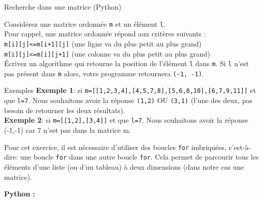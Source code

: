 \begin{Exercice}[20 minutes] Recherche dans une matrice (Python) %
    

    Considérez une matrice ordonnée \lstinline{m} et un élément \lstinline{l}.\\
    
    Pour rappel, une matrice ordonnée répond aux critères suivants :\\
     \lstinline{m[i][j]<=m[i+1][j]} (une ligne va du plus petit au plus grand)\\
     \lstinline{m[i][j]<=m[i][j+1]} (une colonne va du plus petit au plus grand)\\
 
    
    Écrivez un algorithme qui retourne la position de l'élément \lstinline{l} dans \lstinline{m}. Si \lstinline{l} n'est pas présent dans \lstinline{m} alors, votre programme retournera \lstinline{(-1, -1)}.\\
    
    \begin{Example}{\faTerminal \quad Exemples}
        \textbf{Exemple 1}: si \lstinline{m=[[1,2,3,4],[4,5,7,8],[5,6,8,10],[6,7,9,11]]} et que \lstinline{l=7}. Nous souhaitons avoir la réponse \lstinline{(1,2)} OU \lstinline{(3,1)} (l'une des deux, pas besoin de retourner les deux résultats).\\

        \textbf{Exemple 2}: si \lstinline{m=[[1,2],[3,4]]} et que \lstinline{l=7}. Nous souhaitons avoir la réponse (-1,-1) car 7 n'est pas dans la matrice m.
    \end{Example}

    

    \begin{conseil}
    Pour cet exercice, il est nécessaire d'utiliser des boucles \lstinline{for} imbriquées, c'est-à-dire: une boucle \lstinline{for} dans une autre boucle \lstinline{for}. Cela permet de parcourir tous les éléments d'une liste (ou d'un tableau) à deux dimensions (dans notre cas une matrice). 
    \end{conseil}

    \begin{solution}
        \textbf{Python :}
        
    \end{solution}

\end{Exercice}


